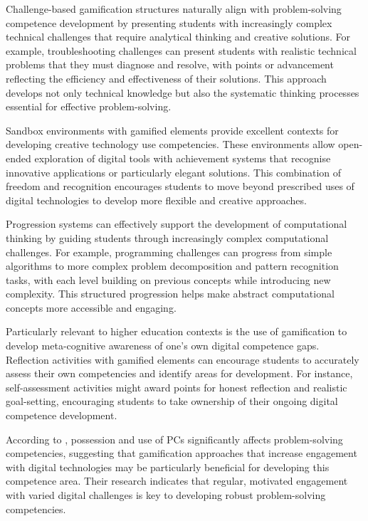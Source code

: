\documentclass[cte]{acnsart}
\begin{document}
Challenge-based gamification structures naturally align with problem-solving competence development by presenting students with increasingly complex technical challenges that require analytical thinking and creative solutions. For example, troubleshooting challenges can present students with realistic technical problems that they must diagnose and resolve, with points or advancement reflecting the efficiency and effectiveness of their solutions. This approach develops not only technical knowledge but also the systematic thinking processes essential for effective problem-solving.

Sandbox environments with gamified elements provide excellent contexts for developing creative technology use competencies. These environments allow open-ended exploration of digital tools with achievement systems that recognise innovative applications or particularly elegant solutions. This combination of freedom and recognition encourages students to move beyond prescribed uses of digital technologies to develop more flexible and creative approaches.

Progression systems can effectively support the development of computational thinking by guiding students through increasingly complex computational challenges. For example, programming challenges can progress from simple algorithms to more complex problem decomposition and pattern recognition tasks, with each level building on previous concepts while introducing new complexity. This structured progression helps make abstract computational concepts more accessible and engaging.

Particularly relevant to higher education contexts is the use of gamification to develop meta-cognitive awareness of one's own digital competence gaps. Reflection activities with gamified elements can encourage students to accurately assess their own competencies and identify areas for development. For instance, self-assessment activities might award points for honest reflection and realistic goal-setting, encouraging students to take ownership of their ongoing digital competence development.

According to \citet{Barboutidis2023613}, possession and use of PCs significantly affects problem-solving competencies, suggesting that gamification approaches that increase engagement with digital technologies may be particularly beneficial for developing this competence area. Their research indicates that regular, motivated engagement with varied digital challenges is key to developing robust problem-solving competencies.
\end{document}
